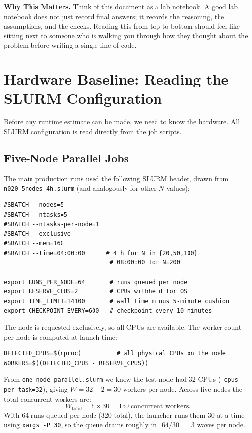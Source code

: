 \documentclass[11pt,oneside]{article}
\newcommand{\akoglu}[1]{\begin{akoglubox}\textbf{Why This Matters.} #1\end{akoglubox}}
\begin{document}
\akoglu{%
Think of this document as a lab notebook. A good lab notebook does not
just record final answers; it records the reasoning, the assumptions,
and the checks. Reading this from top to bottom should feel like
sitting next to someone who is walking you through how they thought
about the problem before writing a single line of code.%
}

\section{Hardware Baseline: Reading the SLURM Configuration}
\label{sec:hardware}

Before any runtime estimate can be made, we need to know the hardware.
All SLURM configuration is read directly from the job scripts.

\subsection{Five-Node Parallel Jobs}

The main production runs used the following SLURM header, drawn from
\texttt{n020\_5nodes\_4h.slurm} (and analogously for other $N$ values):

\begin{lstlisting}[style=bashstyle,caption={SLURM header for five-node jobs.}]
#SBATCH --nodes=5
#SBATCH --ntasks=5
#SBATCH --ntasks-per-node=1
#SBATCH --exclusive
#SBATCH --mem=16G
#SBATCH --time=04:00:00      # 4 h for N in {20,50,100}
                              # 08:00:00 for N=200

export RUNS_PER_NODE=64       # runs queued per node
export RESERVE_CPUS=2         # CPUs withheld for OS
export TIME_LIMIT=14100       # wall time minus 5-minute cushion
export CHECKPOINT_EVERY=600   # checkpoint every 10 minutes
\end{lstlisting}

The node is requested exclusively, so all CPUs are available. The
worker count per node is computed at launch time:

\begin{lstlisting}[style=bashstyle,caption={Worker count derivation in the launcher.},firstnumber=1]
DETECTED_CPUS=$(nproc)          # all physical CPUs on the node
WORKERS=$((DETECTED_CPUS - RESERVE_CPUS))
\end{lstlisting}

From \texttt{one\_node\_parallel.slurm} we know the test node had
32 CPUs (\texttt{--cpus-per-task=32}), giving $W = 32 - 2 = 30$
workers per node. Across five nodes the total concurrent workers are:
\begin{equation}
  W_{\mathrm{total}} = 5 \times 30 = 150 \;\text{concurrent workers.}
  \label{eq:workers}
\end{equation}
With 64 runs queued per node (320 total), the launcher runs them 30 at
a time using \texttt{xargs -P 30}, so the queue drains roughly in
$\lceil 64/30 \rceil = 3$ waves per node.
\end{document}
